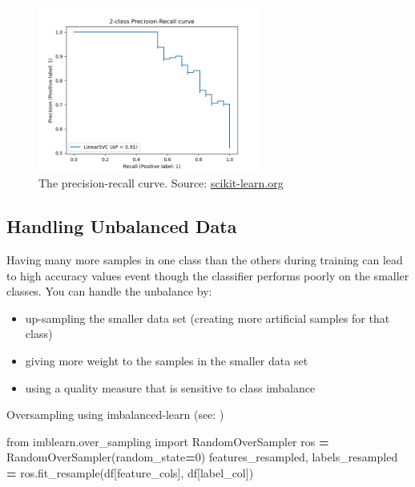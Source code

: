 \documentclass[
]{book}
\newenvironment{Shaded}{\begin{snugshade}}{\end{snugshade}}
\newcommand{\DecValTok}[1]{\textcolor[rgb]{0.00,0.00,0.81}{#1}}
\newcommand{\ImportTok}[1]{#1}
\newcommand{\NormalTok}[1]{#1}
\newcommand{\OperatorTok}[1]{\textcolor[rgb]{0.81,0.36,0.00}{\textbf{#1}}}
\begin{document}
\begin{figure}
\centering
\includegraphics[width=0.65\textwidth,height=\textheight]{figures/pr_curve.png}
\caption{The precision-recall curve. Source:
\href{https://scikit-learn.org/stable/auto_examples/model_selection/plot_precision_recall.html\#:~:text=The\%20precision\%2Drecall\%20curve\%20shows,a\%20low\%20false\%20negative\%20rate.}{scikit-learn.org}}
\end{figure}

\hypertarget{handling-unbalanced-data}{%
\subsection{Handling Unbalanced Data}\label{handling-unbalanced-data}}

Having many more samples in one class than the others during training
can lead to high accuracy values event though the classifier performs
poorly on the smaller classes. You can handle the unbalance by:

\begin{itemize}
\item
  up-sampling the smaller data set (creating more artificial samples
  for that class)
\item
  giving more weight to the samples in the smaller data set
\item
  using a quality measure that is sensitive to class imbalance
\end{itemize}

Oversampling using imbalanced-learn (see: )

\begin{Shaded}
\begin{Highlighting}[]
\ImportTok{from}\NormalTok{ imblearn.over\_sampling }\ImportTok{import}\NormalTok{ RandomOverSampler}
\NormalTok{ros }\OperatorTok{=}\NormalTok{ RandomOverSampler(random\_state}\OperatorTok{=}\DecValTok{0}\NormalTok{)}
\NormalTok{features\_resampled, labels\_resampled }\OperatorTok{=}\NormalTok{ ros.fit\_resample(df[feature\_cols], df[label\_col])}
\end{Highlighting}
\end{Shaded}
\end{document}
